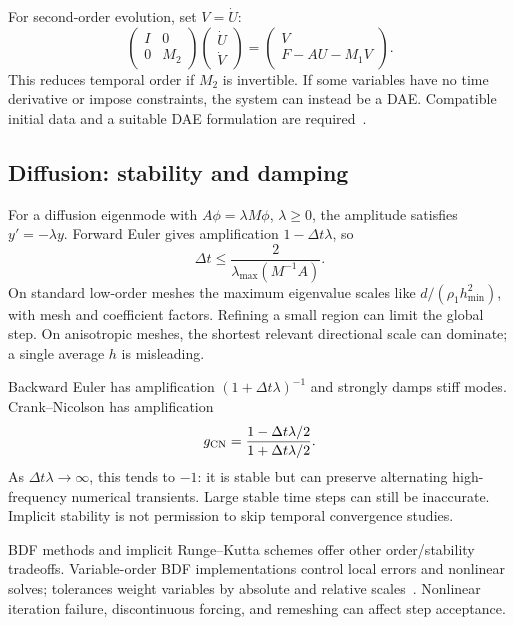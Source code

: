 \documentclass[11pt,a4paper]{article}
\begin{document}
For second-order evolution, set $V=\dot U$:
\begin{equation}
\begin{pmatrix}I&0\\0&M_2\end{pmatrix}
\begin{pmatrix}\dot U\\\dot V\end{pmatrix}
=\begin{pmatrix}V\\F-AU-M_1V\end{pmatrix}.
\end{equation}
This reduces temporal order if $M_2$ is invertible. If some variables have no time derivative or impose constraints, the system can instead be a DAE. Compatible initial data and a suitable DAE formulation are required~\cite{petscts}.

\subsection{Diffusion: stability and damping}
For a diffusion eigenmode with $A\phi=\lambda M\phi$, $\lambda\ge0$, the amplitude satisfies $y'=-\lambda y$. Forward Euler gives amplification $1-\Delta t\lambda$, so
\begin{equation}
\Delta t\le\frac{2}{\lambda_{\max}(M^{-1}A)}.
\end{equation}
On standard low-order meshes the maximum eigenvalue scales like $d/(\rho_1h_{\min}^2)$, with mesh and coefficient factors. Refining a small region can limit the global step. On anisotropic meshes, the shortest relevant directional scale can dominate; a single average $h$ is misleading.

Backward Euler has amplification $(1+\Delta t\lambda)^{-1}$ and strongly damps stiff modes. Crank--Nicolson has amplification
\begin{equation}
g_{\rm CN}=\frac{1-\Delta t\lambda/2}{1+\Delta t\lambda/2}.
\end{equation}
As $\Delta t\lambda\to\infty$, this tends to $-1$: it is stable but can preserve alternating high-frequency numerical transients. Large stable time steps can still be inaccurate. Implicit stability is not permission to skip temporal convergence studies.

BDF methods and implicit Runge--Kutta schemes offer other order/stability tradeoffs. Variable-order BDF implementations control local errors and nonlinear solves; tolerances weight variables by absolute and relative scales~\cite{sundials}. Nonlinear iteration failure, discontinuous forcing, and remeshing can affect step acceptance.
\end{document}
